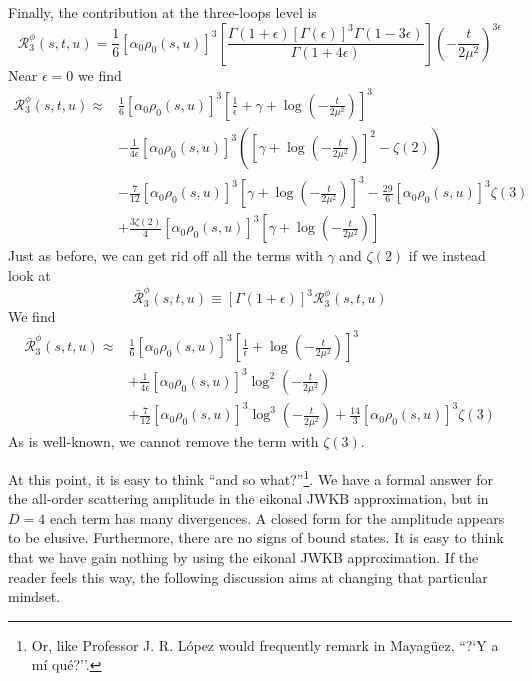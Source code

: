 Finally, the contribution at the three-loops level is
\begin{equation}
	\mathcal{R}_{3}^{\phi}(s, t, u) = \frac{1}{6} \left[ \alpha_{0} \rho_{0}(s, u) \right]^{3} \left[ \frac{\Gamma(1 + \epsilon) [\Gamma(\epsilon)]^{3} \Gamma(1 - 3\epsilon)}{\Gamma(1 + 4 \epsilon)} \right] \left( -\frac{t}{2 \mu^{2}} \right)^{3\epsilon}
\end{equation}
Near $\epsilon = 0$ we find
\begin{align}
	\mathcal{R}_{3}^{\phi}(s, t, u) \approx {}& \frac{1}{6} \left[ \alpha_{0} \rho_{0}(s, u) \right]^{3} \left[ \frac{1}{\epsilon} + \gamma + \log{\left( -\frac{t}{2 \mu^{2}} \right)} \right]^{3} \nonumber \\
	&-\frac{1}{4 \epsilon} \left[ \alpha_{0} \rho_{0}(s, u) \right]^{3} \left( \left[ \gamma + \log{\left( -\frac{t}{2 \mu^{2}} \right)} \right]^{2} - \zeta(2) \right) \nonumber \\
	&-\frac{7}{12} \left[ \alpha_{0} \rho_{0}(s, u) \right]^{3} \left[ \gamma + \log{\left( -\frac{t}{2 \mu^{2}} \right)} \right]^{3} - \frac{29}{6} \left[ \alpha_{0} \rho_{0}(s, u) \right]^{3} \zeta(3) \nonumber \\
	&+ \frac{3 \zeta(2)}{4} \left[ \alpha_{0} \rho_{0}(s, u) \right]^{3} \left[ \gamma + \log{\left( -\frac{t}{2 \mu^{2}} \right)} \right] \label{3Loop4D}
\end{align}
Just as before, we can get rid off all the terms with $\gamma$ and $\zeta(2)$ if we instead look at
\begin{equation}
	\bar{\mathcal{R}}_{3}^{\phi}(s, t, u) \equiv [\Gamma(1 + \epsilon)]^{3} \mathcal{R}_{3}^{\phi}(s, t, u)
\end{equation}
We find
\begin{align}
	\bar{\mathcal{R}}_{3}^{\phi}(s, t, u) \approx {}& \frac{1}{6} \left[ \alpha_{0} \rho_{0}(s, u) \right]^{3} \left[ \frac{1}{\epsilon} + \log{\left( -\frac{t}{2 \mu^{2}} \right)} \right]^{3} \nonumber \\
	&+ \frac{1}{4\epsilon} \left[ \alpha_{0} \rho_{0}(s, u) \right]^{3} \log^{2}{\left( -\frac{t}{2 \mu^{2}} \right)} \nonumber \\
	&+ \frac{7}{12} \left[ \alpha_{0} \rho_{0}(s, u) \right]^{3} \log^{3}{\left( -\frac{t}{2 \mu^{2}} \right)} + \frac{14}{3} \left[ \alpha_{0} \rho_{0}(s, u) \right]^{3} \zeta(3)
\end{align}
As is well-known, we cannot remove the term with $\zeta(3)$.

At this point, it is easy to think ``and so what?''\footnote{Or, like Professor J. R. L\'{o}pez would frequently remark in Mayag\"{u}ez, ``?`Y a m\'{i} qu\'{e}?''.}. We have a formal answer for the all-order scattering amplitude in the eikonal JWKB approximation, but in $D = 4$ each term has many divergences. A closed form for the amplitude appears to be elusive. Furthermore, there are no signs of bound states. It is easy to think that we have gain nothing by using the eikonal JWKB approximation. If the reader feels this way, the following discussion aims at changing that particular mindset.
